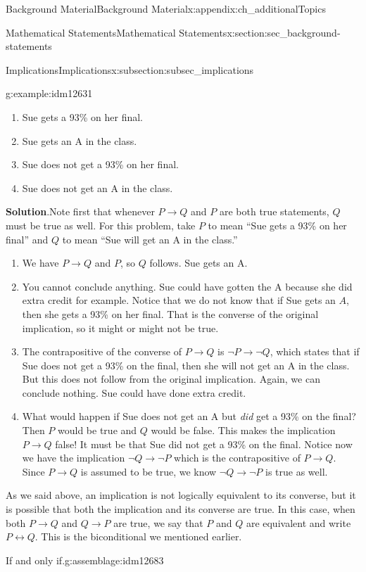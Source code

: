 \documentclass[oneside,10pt,]{book}
\numberwithin{equation}{chapter}
\def\iff{\leftrightarrow}
\def\imp{\rightarrow}
\begin{document}
\begin{appendixptx}{Background Material}{}{Background Material}{}{}{x:appendix:ch_additionalTopics}
\begin{sectionptx}{Mathematical Statements}{}{Mathematical Statements}{}{}{x:section:sec_background-statements}
\begin{subsectionptx}{Implications}{}{Implications}{}{}{x:subsection:subsec_implications}
\begin{example}{}{g:example:idm12631}
\begin{enumerate}
\item{}Sue gets a 93\% on her final.%
\item{}Sue gets an A in the class.%
\item{}Sue does not get a 93\% on her final.%
\item{}Sue does not get an A in the class.%
\end{enumerate}
%
\par\smallskip%
\noindent\textbf{Solution}.\hypertarget{g:solution:idm12644}{}\quad{}Note first that whenever \(P \imp Q\) and \(P\) are both true statements, \(Q\) must be true as well. For this problem, take \(P\) to mean ``Sue gets a 93\% on her final'' and \(Q\) to mean ``Sue will get an A in the class.''%
\par
%
\begin{enumerate}
\item{}We have \(P \imp Q\) and \(P\), so \(Q\) follows. Sue gets an A.%
\item{}You cannot conclude anything. Sue could have gotten the A because she did extra credit for example. Notice that we do not know that if Sue gets an \(A\), then she gets a 93\% on her final. That is the converse of the original implication, so it might or might not be true.%
\item{}The contrapositive of the converse of \(P \imp Q\) is \(\neg P \imp \neg Q\), which states that if Sue does not get a 93\% on the final, then she will not get an A in the class. But this does not follow from the original implication. Again, we can conclude nothing. Sue could have done extra credit.%
\item{}What would happen if Sue does not get an A but \emph{did} get a 93\% on the final? Then \(P\) would be true and \(Q\) would be false. This makes the implication \(P \imp Q\) false! It must be that Sue did not get a 93\% on the final. Notice now we have the implication \(\neg Q \imp \neg P\) which is the contrapositive of \(P \imp Q\). Since \(P \imp Q\) is assumed to be true, we know \(\neg Q \imp \neg P\) is true as well.%
\end{enumerate}
%
\end{example}
As we said above, an implication is not logically equivalent to its converse, but it is possible that both the implication and its converse are true. In this case, when both \(P \imp Q\) and \(Q \imp P\) are true, we say that \(P\) and \(Q\) are equivalent and write \(P \iff Q\). This is the biconditional we mentioned earlier.%
\begin{assemblage}{If and only if.}{g:assemblage:idm12683}%

\end{assemblage}
\end{subsectionptx}
\end{sectionptx}
\end{appendixptx}
\end{document}
